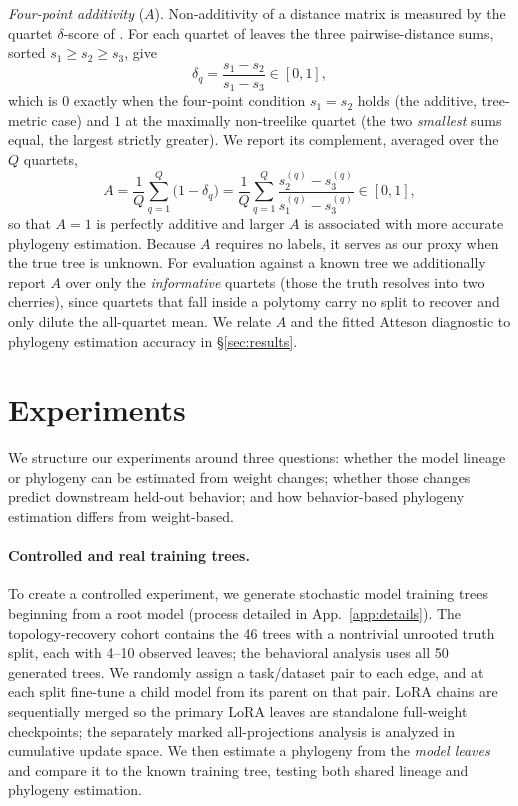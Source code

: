 \documentclass{article}
\theoremstyle{definition}
\theoremstyle{plain}
\begin{document}
\textit{Four-point additivity} ($A$). Non-additivity of a distance matrix is measured by the quartet
$\delta$-score of \citet{holland2002delta}. For each quartet of leaves the three pairwise-distance sums,
sorted $s_1\ge s_2\ge s_3$, give
\[
  \delta_q=\frac{s_1-s_2}{s_1-s_3}\in[0,1] ,
\]
which is $0$ exactly when the four-point condition $s_1=s_2$ holds \citep{sempleSteel2003phylogenetics}
(the additive, tree-metric case) and $1$ at the maximally non-treelike quartet (the two \emph{smallest}
sums equal, the largest strictly greater). We report its complement, averaged over the $Q$ quartets,
\[
  A=\frac{1}{Q}\sum_{q=1}^{Q}\bigl(1-\delta_q\bigr)
   =\frac{1}{Q}\sum_{q=1}^{Q}\frac{s_2^{(q)}-s_3^{(q)}}{s_1^{(q)}-s_3^{(q)}}\in[0,1] ,
\]
so that $A=1$ is perfectly additive and larger $A$ is associated with more accurate phylogeny estimation. Because $A$ requires no labels,
it serves as our proxy when the true tree is unknown. For evaluation against a known tree we
additionally report $A$ over only the \emph{informative} quartets (those the truth resolves into two
cherries), since quartets that fall inside a polytomy carry no split to recover and only dilute the
all-quartet mean. We relate $A$ and the fitted Atteson diagnostic to phylogeny estimation accuracy in \S\ref{sec:results}.


\section{Experiments}
\label{sec:experiments}
We structure our experiments around three questions: whether the model lineage or phylogeny can be
estimated from weight changes; whether those changes predict downstream held-out behavior; and
how behavior-based phylogeny estimation differs from weight-based.

\paragraph{Controlled and real training trees.}
\label{sec:exp:trees}

To create a controlled experiment, we generate stochastic model training trees beginning from a root
model (process detailed in App.~\ref{app:details}). The topology-recovery cohort contains the 46 trees
with a nontrivial unrooted truth split, each with 4--10 observed leaves; the behavioral analysis uses
all 50 generated trees. We randomly assign a task/dataset pair to each edge, and at each split
fine-tune a child model from its parent on that pair. LoRA chains are sequentially merged so the
primary LoRA leaves are standalone full-weight checkpoints; the separately marked all-projections
analysis is analyzed in cumulative update space. We then estimate a phylogeny from the \textit{model
leaves} and compare it to the known training tree, testing both shared lineage and phylogeny
estimation.
\end{document}

